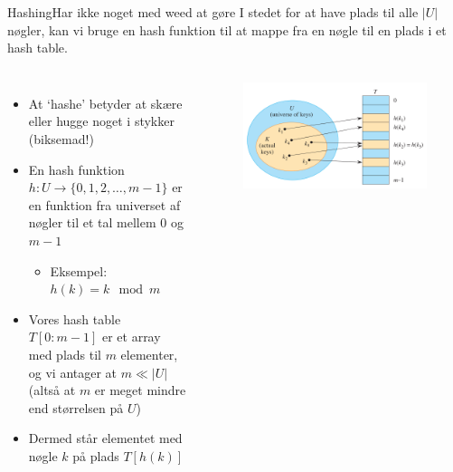\documentclass[aspectratio=1610]{beamer}
\begin{document}
\begin{frame}{Hashing}{Har ikke noget med weed at gøre}
    I stedet for at have plads til alle $|U|$ nøgler, kan vi bruge en
    \alert{hash funktion} til at mappe fra en nøgle til en plads i et
    \alert{hash table}.

    \begin{columns}
        \small
        \begin{itemize}[<+(1)->]
            \item At `hashe' betyder at skære eller hugge noget i stykker
                (biksemad!)
            \item En hash funktion $h: U \rightarrow \{0,1,2,\ldots,m-1\}$ er en
                funktion fra universet af nøgler til et tal mellem 0 og $m-1$
                \begin{itemize}
                    \item Eksempel: $h(k) = k \mod m$
                \end{itemize}
            \item Vores hash table $T[0:m-1]$ er et array med plads til $m$
                elementer, og vi antager at $m \ll |U|$ (altså at $m$ er
                \alert{meget mindre} end størrelsen på $U$)
            \item Dermed står elementet med nøgle $k$ på plads $T[h(k)]$
        \end{itemize}
    
        \begin{figure}[h]
            \centering
            \includegraphics[width=\textwidth]{hash-table}
        \end{figure}
    \end{columns}
\end{frame}
\end{document}
